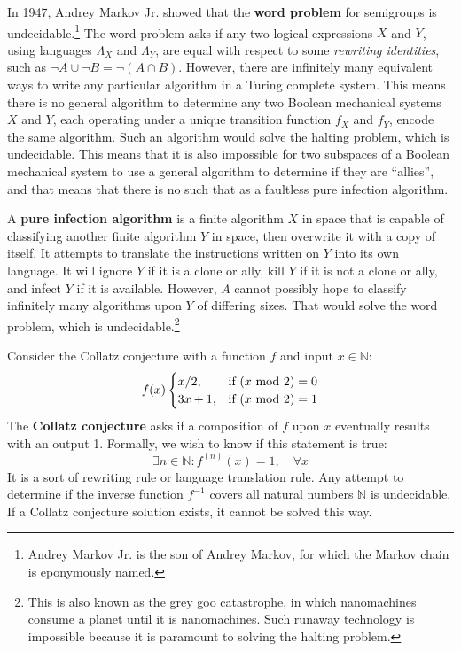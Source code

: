 \documentclass[10pt, a5paper, twoside, openright]{memoir}
\begin{document}
In 1947, Andrey Markov Jr. showed that the \textbf{word problem} for semigroups is undecidable.\footnote{Andrey Markov Jr. is the son of Andrey Markov, for which the Markov chain is eponymously named.} The word problem asks if any two logical expressions $X$ and $Y$, using languages $\Lambda_X$ and $\Lambda_Y$, are equal with respect to some \textit{rewriting identities}, such as $\neg A \cup \neg B = \neg (A \cap B)$. However, there are infinitely many equivalent ways to write any particular algorithm in a Turing complete system. This means there is no general algorithm to determine any two Boolean mechanical systems $X$ and $Y$, each operating under a unique transition function $f_X$ and $f_Y$, encode the same algorithm. Such an algorithm would solve the halting problem, which is undecidable. This means that it is also impossible for two subspaces of a Boolean mechanical system to use a general algorithm to determine if they are ``allies'', and that means that there is no such that as a faultless pure infection algorithm.

A \textbf{pure infection algorithm} is a finite algorithm $X$ in space that is capable of classifying another finite algorithm $Y$ in space, then overwrite it with a copy of itself. It attempts to translate the instructions written on $Y$ into its own language. It will ignore $Y$ if it is a clone or ally, kill $Y$ if it is not a clone or ally, and infect $Y$ if it is available. However, $A$ cannot possibly hope to classify infinitely many algorithms upon $Y$ of differing sizes. That would solve the word problem, which is undecidable.\footnote{This is also known as the grey goo catastrophe, in which nanomachines consume a planet until it is nanomachines. Such runaway technology is impossible because it is paramount to solving the halting problem.}

Consider the Collatz conjecture with a function $f$ and input $x \in \mathbb N$:
\[
f(x)
\begin{cases}
x/2, & \textnormal{if} \ (x \ \textnormal{mod} \ 2) = 0\\
3x+1, & \textnormal{if} \ (x \ \textnormal{mod} \ 2) = 1
\end{cases}
\]The \textbf{Collatz conjecture} asks if a composition of $f$ upon $x$ eventually results with an output 1. Formally, we wish to know if this statement is true:
$$\exists n \in \mathbb N: f^{(n)} (x) = 1, \quad \forall x$$
It is a sort of rewriting rule or language translation rule. Any attempt to determine if the inverse function $f^{-1}$ covers all natural numbers $\mathbb N$ is undecidable. If a Collatz conjecture solution exists, it cannot be solved this way.
\end{document}

